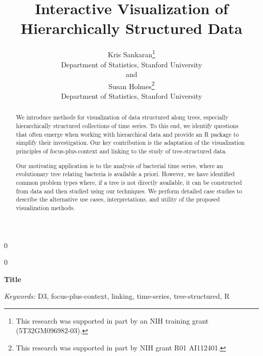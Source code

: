 \documentclass[12pt]{article}
\newcommand{\blind}{0}
\begin{document}
\def\spacingset#1{\renewcommand{\baselinestretch}%
{#1}\small\normalsize} \spacingset{1}



\blind
{
  \title{\bf Interactive Visualization of Hierarchically Structured Data}
  \author{Kris Sankaran\thanks{
      This research was supported in part by an NIH training grant (5T32GM096982-03).}\hspace{.2cm}\\
    Department of Statistics, Stanford University\\
    and \\
    Susan Holmes\thanks{
       This research was supported in part by NIH grant R01 AI112401.
      }\hspace{0.2cm}\\
    Department of Statistics, Stanford University}
  \maketitle
} \fi

\blind
{
  \bigskip
  \bigskip
  \bigskip
  \begin{center}
    {\LARGE\bf Title}
\end{center}
  \medskip
} \fi

\bigskip
\begin{abstract}
We introduce methods for visualization of data structured along trees,
especially hierarchically structured collections of time series.  To
this end, we identify questions that often emerge when working with
hierarchical data and provide an R package to simplify their
investigation. Our key contribution is the adaptation of the
visualization principles of focus-plus-context and linking to the
study of tree-structured data.

Our motivating application is to the analysis of bacterial time
series, where an evolutionary tree relating bacteria is available a
priori. However, we have identified common problem types where, if a
tree is not directly available, it can be constructed from data and
then studied using our techniques. We perform detailed case studies to
describe the alternative use cases, interpretations, and utility of
the proposed visualization methods.

\end{abstract}

\noindent%
{\it Keywords:}  D3, focus-plus-context, linking, time-series, tree-structured, R
\vfill
\end{document}
